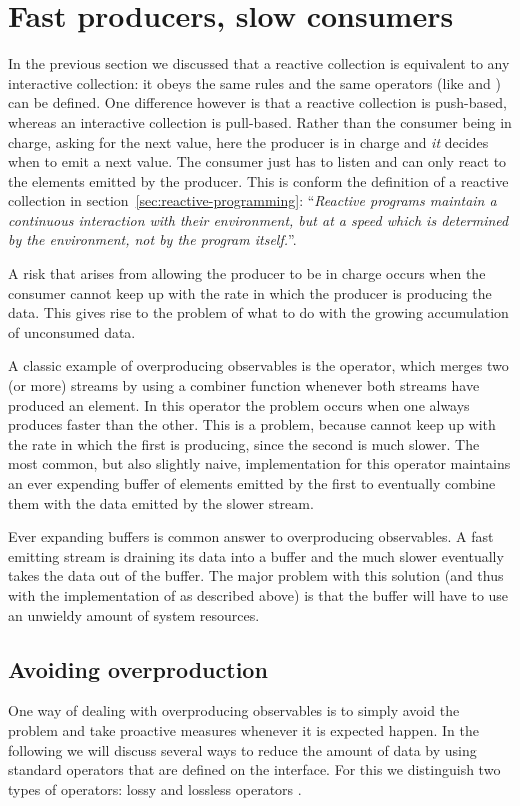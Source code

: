 \section{Fast producers, slow consumers}
\label{sec:fastproc-slowcons}
In the previous section we discussed that a reactive collection is equivalent to any interactive collection: it obeys the same rules and the same operators (like  and ) can be defined. One difference however is that a reactive collection is push-based, whereas an interactive collection is pull-based. Rather than the consumer being in charge, asking for the next value, here the producer is in charge and \emph{it} decides when to emit a next value. The consumer just has to listen and can only react to the elements emitted by the producer. This is conform the definition of a reactive collection in section~\ref{sec:reactive-programming}: ``\textit{Reactive programs maintain a continuous interaction with their environment, but at a speed which is determined by the environment, not by the program itself.}''.

A risk that arises from allowing the producer to be in charge occurs when the consumer cannot keep up with the rate in which the producer is producing the data. This gives rise to the problem of what to do with the growing accumulation of unconsumed data.

A classic example of overproducing observables is the  operator, which merges two (or more) streams by using a combiner function whenever both streams have produced an element. In this operator the problem occurs when one \obs always produces faster than the other. This is a problem, because  cannot keep up with the rate in which the first \obs is producing, since the second \obs is much slower. The most common, but also slightly naive, implementation for this operator maintains an ever expending buffer of elements emitted by the first \obs to eventually combine them with the data emitted by the slower stream.

Ever expanding buffers is common answer to overproducing observables. A fast emitting stream is draining its data into a buffer and the much slower \obv eventually takes the data out of the buffer. The major problem with this solution (and thus with the implementation of  as described above) is that the buffer will have to use an unwieldy amount of system resources.

\subsection{Avoiding overproduction}
\label{subsec:avoiding-overproduction}
One way of dealing with overproducing observables is to simply avoid the problem and take proactive measures whenever it is expected happen. In the following we will discuss several ways to reduce the amount of data by using standard operators that are defined on the \obs interface. For this we distinguish two types of operators: lossy and lossless operators \cite{Backpressure-Explained}.

